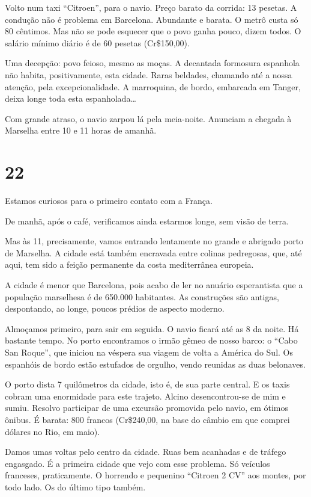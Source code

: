 Volto num taxi “Citroen”, para o navio. Preço barato da corrida: 13 pesetas. A condução não é problema em Barcelona. Abundante e barata. O metrô custa só 80 cêntimos. Mas não se pode esquecer que o povo ganha pouco, dizem todos. O salário mínimo diário é de 60 pesetas (Cr\$150,00).

Uma decepção: povo feioso, mesmo as moças. A decantada formosura espanhola não habita, positivamente, esta cidade. Raras beldades, chamando até a nossa atenção, pela excepcionalidade. A marroquina, de bordo, embarcada em Tanger, deixa longe toda esta espanholada\ldots

Com grande atraso, o navio zarpou lá pela meia-noite. Anunciam a chegada à Marselha entre 10 e 11 horas de amanhã.

\section*{22 \adfflatleafright {}}

Estamos curiosos para o primeiro contato com a França.

De manhã, após o café, verificamos ainda estarmos longe, sem visão de terra.

Mas às 11, precisamente, vamos entrando lentamente no grande e abrigado porto de Marselha. A cidade está também encravada entre colinas pedregosas, que, até aqui, tem sido a feição permanente da costa mediterrânea europeia.

A cidade é menor que Barcelona, pois acabo de ler no anuário esperantista que a população marselhesa é de 650.000 habitantes. As construções são antigas, despontando, ao longe, poucos prédios de aspecto moderno.

Almoçamos primeiro, para sair em seguida. O navio ficará até as 8 da noite. Há bastante tempo. No porto encontramos o irmão gêmeo de nosso barco: o “Cabo San Roque”, que iniciou na véspera sua viagem de volta a América do Sul. Os espanhóis de bordo estão estufados de orgulho, vendo reunidas as duas belonaves.

O porto dista 7 quilômetros da cidade, isto é, de sua parte central. E os taxis cobram uma enormidade para este trajeto. Alcino desencontrou-se de mim e sumiu. Resolvo participar de uma excursão promovida pelo navio, em ótimos ônibus. É barata: 800 francos (Cr\$240,00, na base do câmbio em que comprei dólares no Rio, em maio).

Damos umas voltas pelo centro da cidade. Ruas bem acanhadas e de tráfego engasgado. É a primeira cidade que vejo com esse problema. Só veículos franceses, praticamente. O horrendo e pequenino “Citroen 2 CV” aos montes, por todo lado. Os do último tipo também.

